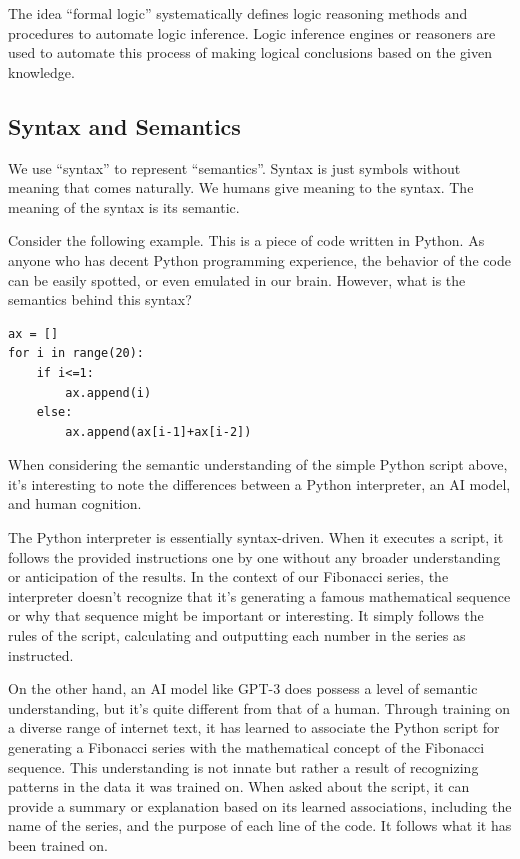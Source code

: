 The idea ``formal logic'' systematically defines logic reasoning methods and procedures to automate logic inference. Logic inference engines or reasoners are used to automate this process of making logical conclusions based on the given knowledge.

\subsection{Syntax and Semantics}

We use ``syntax'' to represent ``semantics''. Syntax is just symbols without meaning that comes naturally. We humans give meaning to the syntax. The meaning of the syntax is its semantic.

Consider the following example. This is a piece of code written in Python. As anyone who has decent Python programming experience, the behavior of the code can be easily spotted, or even emulated in our brain. However, what is the semantics behind this syntax?
\begin{lstlisting}
ax = []
for i in range(20):
	if i<=1:
		ax.append(i)
	else:
		ax.append(ax[i-1]+ax[i-2])
\end{lstlisting}

When considering the semantic understanding of the simple Python script above, it's interesting to note the differences between a Python interpreter, an AI model, and human cognition.

The Python interpreter is essentially syntax-driven. When it executes a script, it follows the provided instructions one by one without any broader understanding or anticipation of the results. In the context of our Fibonacci series, the interpreter doesn't recognize that it's generating a famous mathematical sequence or why that sequence might be important or interesting. It simply follows the rules of the script, calculating and outputting each number in the series as instructed.

On the other hand, an AI model like GPT-3 does possess a level of semantic understanding, but it's quite different from that of a human. Through training on a diverse range of internet text, it has learned to associate the Python script for generating a Fibonacci series with the mathematical concept of the Fibonacci sequence. This understanding is not innate but rather a result of recognizing patterns in the data it was trained on. When asked about the script, it can provide a summary or explanation based on its learned associations, including the name of the series, and the purpose of each line of the code. It follows what it has been trained on.

